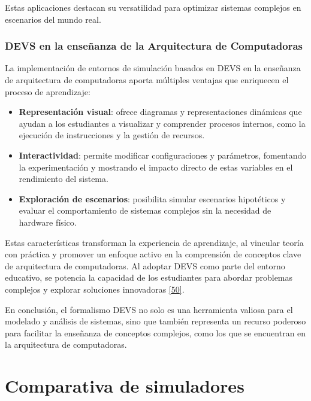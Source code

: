 \documentclass[12pt,oneside]{templates/unerthesis}
\providecommand{\tightlist}{%
  \setlength{\itemsep}{0pt}\setlength{\parskip}{0pt}}
\begin{document}
Estas aplicaciones destacan su versatilidad para optimizar sistemas complejos en escenarios del mundo real.

\hypertarget{devs-en-la-enseuxf1anza-de-la-arquitectura-de-computadoras}{%
\subsection{DEVS en la enseñanza de la Arquitectura de Computadoras}\label{devs-en-la-enseuxf1anza-de-la-arquitectura-de-computadoras}}

La implementación de entornos de simulación basados en DEVS en la enseñanza de arquitectura de computadoras aporta múltiples ventajas que enriquecen el proceso de aprendizaje:

\begin{itemize}
\tightlist
\item
  \textbf{Representación visual}: ofrece diagramas y representaciones dinámicas que ayudan a los estudiantes a visualizar y comprender procesos internos, como la ejecución de instrucciones y la gestión de recursos.
\item
  \textbf{Interactividad}: permite modificar configuraciones y parámetros, fomentando la experimentación y mostrando el impacto directo de estas variables en el rendimiento del sistema.
\item
  \textbf{Exploración de escenarios}: posibilita simular escenarios hipotéticos y evaluar el comportamiento de sistemas complejos sin la necesidad de hardware físico.
\end{itemize}

Estas características transforman la experiencia de aprendizaje, al vincular teoría con práctica y promover un enfoque activo en la comprensión de conceptos clave de arquitectura de computadoras. Al adoptar DEVS como parte del entorno educativo, se potencia la capacidad de los estudiantes para abordar problemas complejos y explorar soluciones innovadoras \protect\hyperlink{ref-calvo_valdes_simulador_2010}{{[}50{]}}.

En conclusión, el formalismo DEVS no solo es una herramienta valiosa para el modelado y análisis de sistemas, sino que también representa un recurso poderoso para facilitar la enseñanza de conceptos complejos, como los que se encuentran en la arquitectura de computadoras.

\hypertarget{comparativa}{%
\chapter{Comparativa de simuladores}\label{comparativa}}
\end{document}
